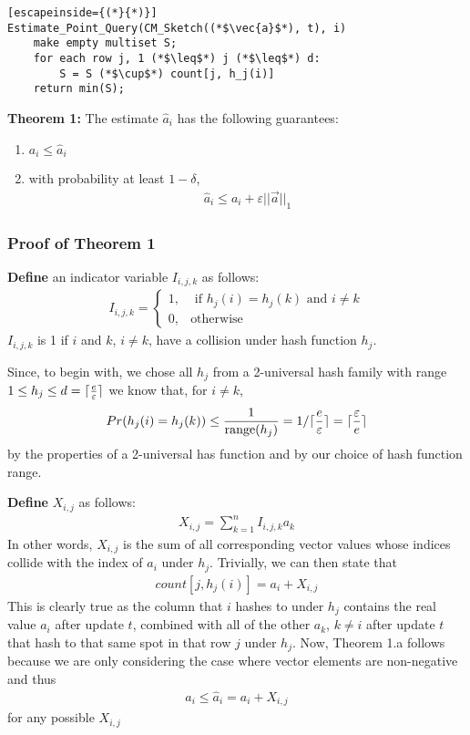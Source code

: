 \documentclass[11pt]{article}
\DeclarePairedDelimiter\ceil{\lceil}{\rceil}
\begin{document}
\begin{lstlisting}[escapeinside={(*}{*)}]
Estimate_Point_Query(CM_Sketch((*$\vec{a}$*), t), i) 
    make empty multiset S;
    for each row j, 1 (*$\leq$*) j (*$\leq$*) d:
        S = S (*$\cup$*) count[j, h_j(i)]
    return min(S);
\end{lstlisting}

\textbf{Theorem 1:} The estimate $\hat a_i$ has the following guarantees:
\begin{enumerate}[label=\textnormal{(\arabic*)}]
    \item $a_i \leq \hat{a}_i$
    \item with probability at least $1 - \delta$, 
    \begin{align}
        \hat{a}_i \leq a_i + \varepsilon ||\vec{a}||_1 
    \end{align}
\end{enumerate}
\subsubsection{Proof of Theorem 1}
\textbf{Define} an indicator variable $I_{i, j, k}$ as follows:
\begin{align}
    I_{i, j, k} = 
    \begin{cases}
        1, & \text{ if } h_j(i) = h_j(k) \text{ and } i \neq k \\
        0, & \text{otherwise}
    \end{cases}
\end{align}
$I_{i, j, k}$ is 1 if $i$ and $k$, $i \neq k$, have a collision under hash function $h_j$.

Since, to begin with, we chose all $h_j$ from a 2-universal hash family
with range $1 \leq h_j \leq d = \ceil{\frac{e}{\varepsilon}}$ 
we know that, for $i \neq k$,
\begin{align}\label{eq:collision-prob}
    Pr(h_j(i) = h_j(k)) \leq \frac{1}{\text{range}(h_j)} = 1/\ceil{\frac{e}{\varepsilon}} = \ceil{\frac{\varepsilon}{e}}
\end{align}
by the properties of a 2-universal has function and by our choice of hash function
range.

\textbf{Define} $X_{i, j}$ as follows:
\begin{align}
    X_{i, j} = \sum_{k = 1}^{n}I_{i, j, k} a_k
\end{align}
In other words, $X_{i, j}$ is the sum of all corresponding vector values whose indices
collide with the index of $a_i$ under $h_j$. Trivially, we can then state that
\begin{align}\label{eq:count-def}
    count[j, h_j(i)] = a_i + X_{i, j} 
\end{align}
This is clearly true as the column that $i$ hashes to under $h_j$
contains the real value $a_i$ after update $t$, combined with all of the other
$a_k$, $k \neq i$ after update $t$ that hash to that same spot in that row $j$ under
$h_j$.   Now, Theorem 1.a follows because we are only considering the case where vector
elements are non-negative and thus
\begin{align}
    a_i \leq \hat a_i = a_i + X_{i, j}
\end{align}
for any possible $X_{i, j}$
\end{document}
